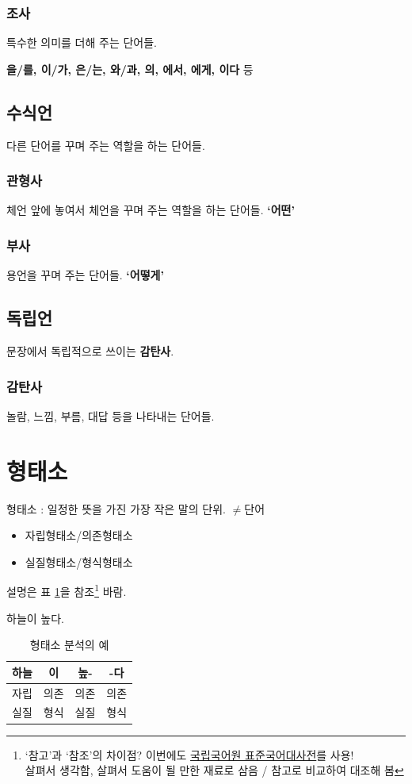 \documentclass[10pt]{report}
\newcommand{\tl}{\textquoteleft}
\newcommand{\tr}{\textquoteright}
\newcommand{\std}{\href{http://stdweb2.korean.go.kr}{\color{blue}국립국어원 표준국어대사전}}
\begin{document}
\subsubsection{조사}
특수한 의미를 더해 주는 단어들.

\textbf{을/를, 이/가, 은/는, 와/과, 의, 에서, 에게, 이다} 등

\subsection{수식언}
다른 단어를 꾸며 주는 역할을 하는 단어들.

\subsubsection{관형사}
체언 앞에 놓여서 체언을 꾸며 주는 역할을 하는 단어들. \textbf{\tl 어떤\tr}
\subsubsection{부사}
용언을 꾸며 주는 단어들. \textbf{\tl 어떻게\tr}

\subsection{독립언}
문장에서 독립적으로 쓰이는 \textbf{감탄사}.
\subsubsection{감탄사}
놀람, 느낌, 부름, 대답 등을 나타내는 단어들.

\section{형태소}
형태소 : 일정한 뜻을 가진 가장 작은 말의 단위. $\neq$단어
\begin{itemize}
\item 자립형태소/의존형태소
\item 실질형태소/형식형태소
\end{itemize}
설명은 표 \ref{morpheme}을 참조\footnote{\tl 참고\tr 과 \tl 참조\tr 의 차이점? 이번에도 \std 를 사용!\\ 살펴서 생각함, 살펴서 도움이 될 만한 재료로 삼음 / 참고로 비교하여 대조해 봄} 바람.
\begin{table}
\begin{center}
	하늘이 높다.
		\begin{tabular}{|c|c|c|c|}
			\hline
			하늘 & 이 & 높- & -다 \\
			\hline
			자립 & 의존 & 의존 & 의존 \\
			\hline
			실질 & 형식 & 실질 & 형식 \\
			\hline
		\end{tabular}
	\caption{형태소 분석의 예}
	\label{morpheme}
\end{center}
\end{table}
\end{document}
